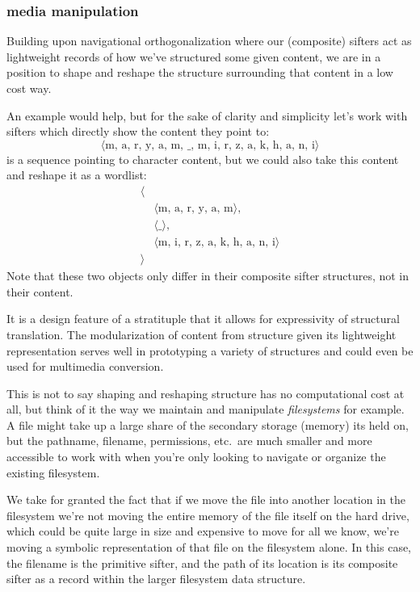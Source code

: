 \documentclass[twoside]{article}
\begin{document}
\subsubsection*{media manipulation}

Building upon navigational orthogonalization where our (composite) sifters act as lightweight records of how we've structured
some given content, we are in a position to shape and reshape the structure surrounding that content in a low cost way.

An example would help, but for the sake of clarity and simplicity
let's work with sifters which directly show the content they point to:
$$ \langle\mbox{m, a, r, y, a, m, \_, m, i, r, z, a, k, h, a, n, i}\rangle $$
is a sequence pointing to character content, but we could also take this content and reshape it as a wordlist:
$$ \begin{array}{rl}
\langle							\\
 & \langle\mbox{m, a, r, y, a, m}\rangle,		\\
 & \langle\mbox{\_}\rangle,				\\
 & \langle\mbox{m, i, r, z, a, k, h, a, n, i}\rangle	\\
\rangle
\end{array} $$
Note that these two objects only differ in their composite sifter structures, not in their content.

It is a design feature of a stratituple that it allows for expressivity of structural translation.
The modularization of content from structure given its lightweight representation serves well
in prototyping a variety of structures and could even be used for multimedia conversion.

This is not to say shaping and reshaping structure has no computational cost at all, but think of it the way
we maintain and manipulate \emph{filesystems} for example. A file might take up a large share of the secondary storage
(memory) its held on, but the pathname, filename, permissions, etc.~are much smaller and more accessible to work with when
you're only looking to navigate or organize the existing filesystem.

We take for granted the fact that if we move the file into another location in the filesystem we're not moving
the entire memory of the file itself on the hard drive, which could be quite large in size and expensive to move
for all we know, we're moving a symbolic representation of that file on the filesystem alone. In this case,
the filename is the primitive sifter, and the path of its location is its composite sifter as a record within
the larger filesystem data structure.
\end{document}

